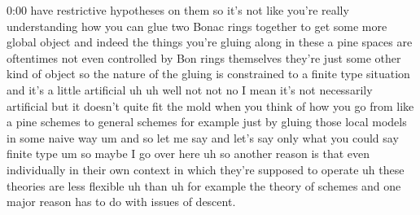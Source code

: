 \begin{unfinished}{0:00}
 have restrictive hypotheses on them so it's not like you're really understanding how you can glue two Bonac rings together to get some more global object and indeed the things you're gluing along in these a pine spaces are oftentimes not even controlled by Bon rings themselves they're just some other kind of object so the nature of the gluing is constrained to a finite type situation and it's a little artificial uh uh well not not no I mean it's not necessarily artificial but it doesn't quite fit the mold when you think of how you go from like a pine schemes to general schemes for example just by gluing those local models in some naive way um and so let me say and let's say only what you could say finite type um so maybe I go over here uh so another reason is that even individually in their own context in which they're supposed to operate uh these theories are less flexible uh than uh for example the theory of schemes and one major reason has to do with issues of descent.


\end{unfinished}
